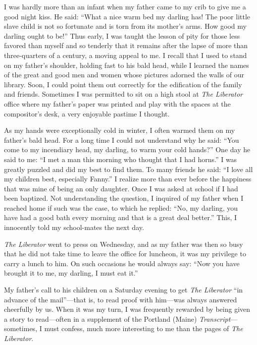 \documentclass{book}
\begin{document}
I was hardly more than an infant when my father came to my crib to give me a good night kiss. He said: “What a nice warm bed my darling has! The poor little slave child is not so fortunate and is torn from its mother’s arms. How good my darling ought to be!” Thus early, I was taught the lesson of pity for those less favored than myself and so tenderly that it remains after the lapse of more than three-quarters of a century, a moving appeal to me. I recall that I used to stand on my father’s shoulder, holding fast to his bald head, while I learned the names of the great and good men and women whose pictures adorned the walls of our library. Soon, I could point them out correctly for the edification of the family and friends. Sometimes I was permitted to sit on a high stool at \emph{The Liberator} office where my father’s paper was printed and play with the spaces at the compositor’s desk, a very enjoyable pastime I thought.

As my hands were exceptionally cold in winter, I often warmed them on my father’s bald head. For a long time I could not understand why he said: “You come to my incendiary head, my darling, to warm your cold hands?” One day he said to me: “I met a man this morning who thought that I had horns.” I was greatly puzzled and did my best to find them. To many friends he said: “I love all my children best, especially Fanny.” I realize more than ever before the happiness that was mine of being an only daughter. Once I was asked at school if I had been baptized. Not understanding the question, I inquired of my father when I reached home if such was the case, to which he replied: “No, my darling, you have had a good bath every morning and that is a great deal better.” This, I innocently told my school-mates the next day.

\emph{The Liberator} went to press on Wednesday, and as my father was then so busy that he did not take time to leave the office for luncheon, it was my privilege to carry a lunch to him. On such occasions he would always say: “Now you have brought it to me, my darling, I must eat it.”

My father’s call to his children on a Saturday evening to get \emph{The Liberator} “in advance of the mail”—that is, to read proof with him—was always answered cheerfully by us. When it was my turn, I was frequently rewarded by being given a story to read—often in a supplement of the Portland (Maine) \emph{Transcript}—sometimes, I must confess, much more interesting to me than the pages of \emph{The Liberator}.
\end{document}
